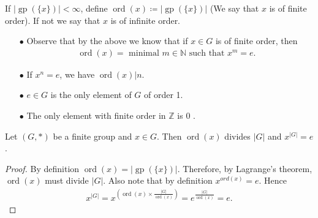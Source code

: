 \documentclass{article}
\newcommand{\gp}{\operatorname{gp}}
\newcommand{\ord}{\operatorname{ord}}
\begin{document}
\begin{defa}
     If $|\gp(\{x\})|<\infty$, define $\ord(x)\coloneqq |\gp(\{x\})| $ (We say that $x$ is of finite order). If not we say that $x$ is of infinite order.
\end{defa} 
\begin{cora}\text{ }
\begin{itemize}
\item[$\bullet$] Observe that by the above we know that if $x \in G$ is of finite order, then
\begin{align*}
\operatorname{ord}(x)=\text { minimal } m \in \mathbb{N} \text { such that } x^{m}=e.
\end{align*} 
\item[$\bullet$] If $x^{n}=e$,  we have $\ord(x)| n$.
\item[$\bullet$] $e \in G$ is the only element of $G$ of order 1.
\item[$\bullet$] The only element with finite order in $\mathbb{Z}$ is 0 .
\end{itemize} 
\end{cora}

\begin{cora}\label{cor:ondqefvs23}
Let $(G, *)$ be a finite group and $x \in G .$ Then $\ord(x)$ divides $|G|$ and $x^{|G|}=e$.
\end{cora} 
\begin{proof}
By definition $\operatorname{ord}(x)=|\gp(\{x\})|$. Therefore, by Lagrange's theorem, $\ord(x)$ must divide $|G|$. Also note that by definition $x^{o r d(x)}=e$. Hence
\begin{align*}
x^{|G|}=x^{\left(\operatorname{ord}(x) \times \frac{|G|}{\ord(x)}\right)}=e^{\frac{|G|}{\ord(x)}}=e .
\end{align*}
\end{proof} 
\end{document}
